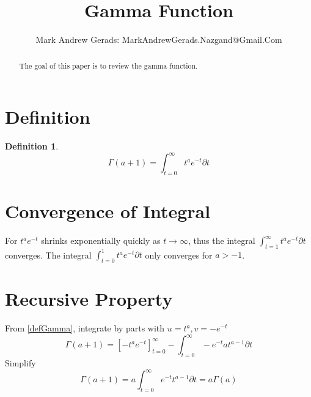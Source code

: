 \documentclass[]{article}
\author{Mark Andrew Gerads: MarkAndrewGerads.Nazgand@Gmail.Com}
\title{Gamma Function}
\newcommand{\pqty}[1]{{\left(#1\right)}}
\newcommand{\bqty}[1]{{\left[#1\right]}}
\newtheorem{definition}[theorem]{Definition}
\numberwithin{equation}{section}
\begin{document}
	
	\maketitle
	
	\begin{abstract}
		The goal of this paper is to review the gamma function.
	\end{abstract}
	
	\section{Definition}
	\begin{definition}
		\begin{equation}
		\label{defGamma}
		\Gamma\pqty{a+1}=\int_{t=0}^\infty t^a e^{-t} \partial t
		\end{equation}
	\end{definition}
	
	\section{Convergence of Integral}
	For \(t^a e^{-t}\) shrinks exponentially quickly as \(t\to\infty\), thus the integral \(\int_{t=1}^\infty t^a e^{-t} \partial t\) converges.
	The integral \(\int_{t=0}^1 t^a e^{-t} \partial t\) only converges for \(a>-1\).
	
	\section{Recursive Property}
	From \eqref{defGamma}, integrate by parts with \(u=t^a, v=-e^{-t}\)
	\begin{equation}
	\Gamma\pqty{a+1}=\bqty{-t^ae^{-t}}_{t=0}^\infty - 
	\int_{t=0}^\infty -e^{-t}at^{a-1} \partial t
	\end{equation}
	Simplify
	\begin{equation}
	\Gamma\pqty{a+1}= 
	a\int_{t=0}^\infty e^{-t}t^{a-1} \partial t= 
	a\Gamma\pqty{a}
	\end{equation}
\end{document}
